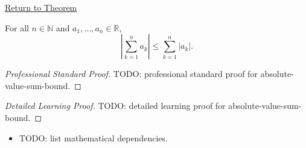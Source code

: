 \newpage
{}
\label{prf:absolute-value-sum-bound}

\begin{remark*}[Return]
\hyperref[thm:absolute-value-sum-bound]{Return to Theorem}
\end{remark*}

\begin{theorem*}
For all $n \in \mathbb{N}$ and $a_1, \ldots, a_n \in \mathbb{R}$,
\[
  \left\lvert \sum_{k=1}^{n} a_k \right\rvert
  \le \sum_{k=1}^{n} \lvert a_k \rvert.
\]
\end{theorem*}

\begin{proof}[Professional Standard Proof]
\LRAProofBodyStart
TODO: professional standard proof for absolute-value-sum-bound.
\end{proof}

\begin{proof}[Detailed Learning Proof]
\LRAProofBodyStart
TODO: detailed learning proof for absolute-value-sum-bound.
\end{proof}

\begin{remark*}
\end{remark*}

\begin{dependencies}
\begin{itemize}
  \item TODO: list mathematical dependencies.
\end{itemize}
\end{dependencies}

\clearpage
